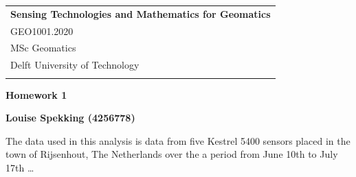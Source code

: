 \documentclass[a4paper,12pt]{article} %
\begin{document}



\thispagestyle{empty} %

\begin{tabular}{p{15.5cm}} %
{\large \bf Sensing Technologies and Mathematics for Geomatics} \\
GEO1001.2020 \\ MSc Geomatics \\ Delft University of Technology \\
\hline %
\\
\end{tabular} %

\vspace*{0.3cm} %

\begin{center} %
	{\Large \bf Homework 1} %
	\vspace{2mm}
	
	{\bf Louise Spekking (4256778)} %
		
\end{center}  

\vspace{0.4cm}


The data used in this analysis is data from five Kestrel 5400 sensors placed in the town of Rijsenhout, The Netherlands over the a period from June 10th to July 17th \ldots  \cite{data}
\end{document}
